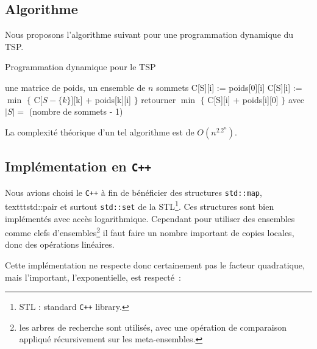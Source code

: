 \subsection{Algorithme}

Nous proposons l'algorithme suivant pour une programmation dynamique
du TSP.

\begin{algorithm}[!ht]
\caption{Programmation dynamique pour le TSP}
\label{Dyntsp}
\begin{algorithmic}[1]
\REQUIRE une matrice de poids, un ensemble de $n$ sommets
\STATE C[S][i] := poids[0][i]
\ENDFOR
\ELSE
{}
\STATE C[S][i] := $\min$ $\{$ C[$S - \{ k \} $][k] + poids[k][i] $\}$
\ENDFOR
\ENDFOR
\ENDIF
\ENDFOR
\STATE retourner $\min$ $\{$ C[S][i] + poids[i][0] $\}$ avec $|S| = $
(nombre de sommets - 1)
\end{algorithmic}
\end{algorithm}

La complexité théorique d'un tel algorithme est de $O(n^2.2^n)$.

\subsection{Implémentation en \texttt{C++}}

Nous avions choisi le \texttt{C++} à fin de bénéficier des structures \texttt{std::map}, texttt{std::pair} et surtout \texttt{std::set} de la STL\footnote{STL : standard \texttt{C++} library.}. Ces structures sont bien implémentés avec accès logarithmique. Cependant pour utiliser des ensembles comme clefs d'ensembles\footnote{les arbres de recherche sont utilisés, avec une opération de comparaison appliqué récursivement sur les meta-ensembles.} il faut faire un nombre important de copies locales, donc des opérations linéaires. 

Cette implémentation ne respecte donc certainement pas le facteur quadratique, mais l'important, l'exponentielle, est respecté~:

\vspace{0.5cm}

